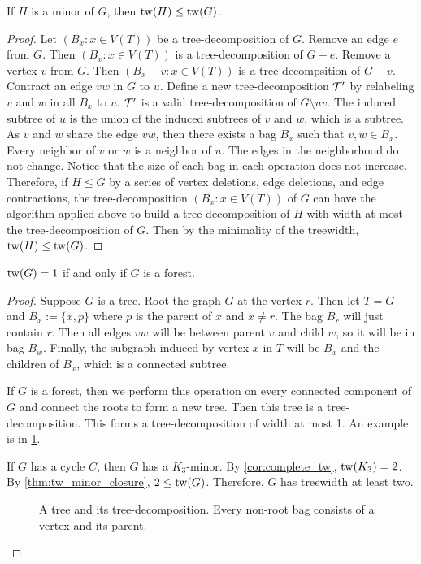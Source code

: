 \begin{theorem}\label{thm:tw_minor_closure}
	If \(H\) is a minor of \(G\), then \(\operatorname{tw}(H) \leq \operatorname{tw}(G)\).
\end{theorem}
\begin{proof}
	Let \((B_x : x \in V(T))\) be a tree-decomposition of \(G\). Remove an edge $e$ from $G$. Then \((B_x : x \in V(T))\) is a tree-decomposition of $G - e$. Remove a vertex $v$ from $G$. Then \((B_x - v : x \in V(T))\) is a tree-decompsition of $G - v$. Contract an edge $vw$ in $G$ to $u$. Define a new tree-decomposition $\mathcal{T}'$ by relabeling \(v\) and \(w\) in all $B_x$ to \(u\). $\mathcal{T}'$ is a valid tree-decomposition of $G \setminus uv$. The induced subtree of \(u\) is the union of the induced subtrees of \(v\) and \(w\), which is a subtree. As $v$ and $w$ share the edge $vw$, then there exists a bag $B_x$ such that $v, w \in B_x$. Every neighbor of \(v\) or \(w\) is a neighbor of \(u\). The edges in the neighborhood do not change. Notice that the size of each bag in each operation does not increase. Therefore, if $H \leq G$ by a series of vertex deletions, edge deletions, and edge contractions, the tree-decomposition \((B_x : x \in V(T))\) of $G$ can have the algorithm applied above to build a tree-decomposition of $H$ with width at most the tree-decomposition of $G$. Then by the minimality of the treewidth, \(\operatorname{tw}(H) \leq \operatorname{tw}(G)\). 
\end{proof}

\begin{lemma}\label{lem:treewidth_forest}
	\(\operatorname{tw}(G) = 1\) if and only if \(G\) is a forest.
\end{lemma}

\begin{proof}
	Suppose \(G\) is a tree. Root the graph \(G\) at the vertex \(r\). Then let \(T = G\) and \(B_x:= \lbrace x, p \rbrace\) where \(p\) is the parent of \(x\) and $x \neq r$. The bag \(B_r\) will just contain \(r\). Then all edges \(vw\) will be between parent \(v\) and child \(w\), so it will be in bag \(B_w\). Finally, the subgraph induced by vertex \(x\) in \(T\) will be \(B_x\) and the children of \(B_x\), which is a connected subtree.
	\par
	If \(G\) is a forest, then we perform this operation on every connected component of \(G\) and connect the roots to form a new tree. Then this tree is a tree-decomposition. This forms a tree-decomposition of width at most 1. An example is in \cref{fig:tree-treedecomp}.
	\par
	If \(G\) has a cycle \(C\), then $G$ has a $K_3$-minor. By \cref{cor:complete_tw}, $\operatorname{tw}(K_3) = 2$. By \cref{thm:tw_minor_closure}, $2 \leq \operatorname{tw}(G)$. Therefore, $G$ has treewidth at least two. 
	\begin{figure}[ht]
		\centering
		
		
		\caption{A tree and its tree-decomposition. Every non-root bag consists of a vertex and its parent.}\label{fig:tree-treedecomp}
	\end{figure}
\end{proof}

